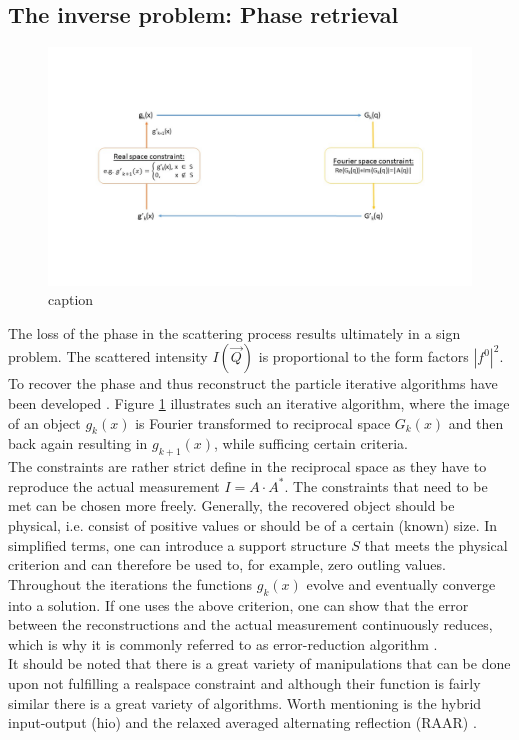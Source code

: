 \subsection{The inverse problem: Phase retrieval}
\begin{figure}
	\centering
		\includegraphics[width=1.00\textwidth]{images/phase-retrieval-algorithm.jpg}
	\caption{caption}
	\label{fig:phase-retrieval-algorithm}
\end{figure}
The loss of the phase in the scattering process results ultimately in a sign problem. The scattered intensity $I\left(\vec{Q}\right)$ is proportional to the form factors $\left|f^{0}\right|^{2}$. To recover the phase and thus reconstruct the particle iterative algorithms have been developed \cite{Fienup-1982-AO}. Figure \ref{fig:phase-retrieval-algorithm} illustrates such an iterative algorithm, where the image of an object $g_{k}\left(x\right)$ is Fourier transformed to reciprocal space $G_{k}\left(x\right)$ and then back again resulting in $g_{k+1}(x)$, while sufficing certain criteria.\\
The constraints are rather strict define in the reciprocal space as they have to reproduce the actual measurement $I=A\cdot A^{*}$. The constraints that need to be met can be chosen more freely. Generally, the recovered object should be physical, i.e. consist of positive values or should be of a certain (known) size. In simplified terms, one can introduce a support structure $S$ that meets the physical criterion and can therefore be used to, for example, zero outling values. Throughout the iterations the functions $g_{k}(x)$ evolve and eventually converge into a solution. If one uses the above criterion, one can show that the error between the reconstructions and the actual measurement continuously reduces, which is why it is commonly referred to as error-reduction algorithm \cite{Fienup-1978-OL}.\\
It should be noted that there is a great variety of manipulations that can be done upon not fulfilling a realspace constraint and although their function is fairly similar there is a great variety of algorithms. Worth mentioning is the hybrid input-output (hio) \cite{Fienup-1978-OL} and the relaxed averaged alternating reflection (RAAR) \cite{Luke-2005-IP}.
